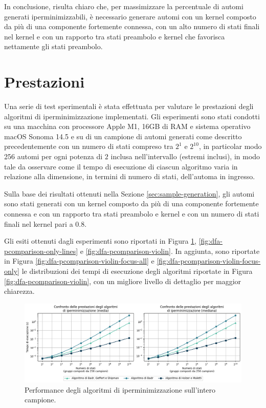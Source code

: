\documentclass[a4paper,12pt,twoside, openright]{report} %
\begin{document}
In conclusione, risulta chiaro che, per massimizzare la percentuale di automi generati iperminimizzabili,
è necessario generare automi con un kernel composto da più di una componente fortemente connessa, con un alto
numero di stati finali nel kernel e con un rapporto tra stati preambolo e kernel che favorisca nettamente
gli stati preambolo.

\section{Prestazioni}

Una serie di test sperimentali è stata effettuata per valutare le prestazioni degli algoritmi di iperminimizzazione
implementati. Gli esperimenti sono stati condotti su una macchina con processore Apple M1, 16GB di RAM e sistema
operativo macOS Sonoma 14.5 e su di un campione di automi generati come descritto precedentemente con un numero di
stati compreso tra $2^1$ e $2^{10}$, in particolar modo 256 automi per ogni potenza di $2$ inclusa nell'intervallo
(estremi inclusi), in modo tale da osservare come il tempo di esecuzione di ciascun algoritmo varia in relazione
alla dimensione, in termini di numero di stati, dell’automa in ingresso.

Sulla base dei risultati ottenuti nella Sezione \ref{sec:sample-generation}, gli automi sono stati generati con 
un kernel composto da più di una componente fortemente connessa e con un rapporto tra stati preambolo e kernel
e con un numero di stati finali nel kernel pari a $0.8$.

Gli esiti ottenuti dagli esperimenti sono riportati in Figura \ref{fig:dfa-pcomparison-all-lines}, 
\ref{fig:dfa-pcomparison-only-lines} e \ref{fig:dfa-pcomparison-violin}. In aggiunta, sono riportate
in Figura \ref{fig:dfa-pcomparison-violin-focus-all} e \ref{fig:dfa-pcomparison-violin-focus-only}
le distribuzioni dei tempi di esecuzione degli algoritmi riportate in Figura \ref{fig:dfa-pcomparison-violin},
con un migliore livello di dettaglio per maggior chiarezza.

\begin{figure}[!htb]
  \centering
  \includegraphics[width=1\linewidth]{images/performance_all_line.png}
  \caption{\label{fig:dfa-pcomparison-all-lines}Performance degli algoritmi di iperminimizzazione sull'intero campione.}
\end{figure}
\end{document}
